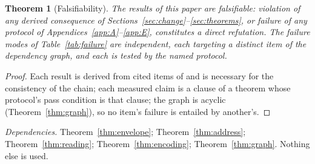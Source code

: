 \documentclass[pdflatex,sn-mathphys-num]{sn-jnl}
\theoremstyle{thmstyleone}%
\newtheorem{theorem}{Theorem}[section]
\theoremstyle{thmstyletwo}%
\theoremstyle{thmstylethree}%
\newtheorem{theorem}{Theorem}[section]
\newcommand{\PA}{\cite{Swanagon2026PA}}
\newcommand{\deps}[1]{\par\begin{sloppypar}\noindent\emph{Dependencies.} #1 Nothing else is used.\end{sloppypar}}
\begin{document}
\begin{theorem}[Falsifiability]\label{thm:falsifiability}
The results of this paper are falsifiable: violation of any derived consequence of Sections~\ref{sec:change}--\ref{sec:theorems}, or failure of any protocol of Appendices~\ref{app:A}--\ref{app:E}, constitutes a direct refutation. The failure modes of Table~\ref{tab:failure} are independent, each targeting a distinct item of the dependency graph, and each is tested by the named protocol.
\end{theorem}
\begin{proof}
Each result is derived from cited items of \PA{} and is necessary for the consistency of the chain; each measured claim is a clause of a theorem whose protocol's pass condition is that clause; the graph is acyclic (Theorem~\ref{thm:graph}), so no item's failure is entailed by another's.
\end{proof}
\deps{Theorem~\ref{thm:envelope}; Theorem~\ref{thm:address}; Theorem~\ref{thm:reading}; Theorem~\ref{thm:encoding}; Theorem~\ref{thm:graph}.}
\end{document}
